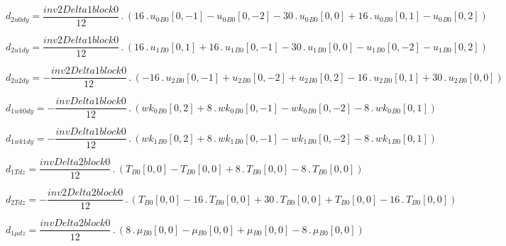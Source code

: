 \documentclass{article}
\begin{document}
\begin{dmath}d_{2 u0 dy} = \frac{inv2Delta1block0}{12} \,.\, \left(16 \,.\, {u_{0}{_{B0}}}[{0,-1}] - {u_{0}{_{B0}}}[{0,-2}] - 30 \,.\, {u_{0}{_{B0}}}[{0,0}] + 16 \,.\, {u_{0}{_{B0}}}[{0,1}] - {u_{0}{_{B0}}}[{0,2}]\right)\end{dmath}

\begin{dmath}d_{2 u1 dy} = \frac{inv2Delta1block0}{12} \,.\, \left(16 \,.\, {u_{1}{_{B0}}}[{0,1}] + 16 \,.\, {u_{1}{_{B0}}}[{0,-1}] - 30 \,.\, {u_{1}{_{B0}}}[{0,0}] - {u_{1}{_{B0}}}[{0,-2}] - {u_{1}{_{B0}}}[{0,2}]\right)\end{dmath}

\begin{dmath}d_{2 u2 dy} = - \frac{inv2Delta1block0}{12} \,.\, \left(- 16 \,.\, {u_{2}{_{B0}}}[{0,-1}] + {u_{2}{_{B0}}}[{0,-2}] + {u_{2}{_{B0}}}[{0,2}] - 16 \,.\, {u_{2}{_{B0}}}[{0,1}] + 30 \,.\, {u_{2}{_{B0}}}[{0,0}]\right)\end{dmath}

\begin{dmath}d_{1 wk0 dy} = - \frac{invDelta1block0}{12} \,.\, \left({wk_{0}{_{B0}}}[{0,2}] + 8 \,.\, {wk_{0}{_{B0}}}[{0,-1}] - {wk_{0}{_{B0}}}[{0,-2}] - 8 \,.\, {wk_{0}{_{B0}}}[{0,1}]\right)\end{dmath}

\begin{dmath}d_{1 wk1 dy} = - \frac{invDelta1block0}{12} \,.\, \left({wk_{1}{_{B0}}}[{0,2}] + 8 \,.\, {wk_{1}{_{B0}}}[{0,-1}] - {wk_{1}{_{B0}}}[{0,-2}] - 8 \,.\, {wk_{1}{_{B0}}}[{0,1}]\right)\end{dmath}

\begin{dmath}d_{1 T dz} = \frac{invDelta2block0}{12} \,.\, \left({T{_{B0}}}[{0,0}] - {T{_{B0}}}[{0,0}] + 8 \,.\, {T{_{B0}}}[{0,0}] - 8 \,.\, {T{_{B0}}}[{0,0}]\right)\end{dmath}

\begin{dmath}d_{2 T dz} = - \frac{inv2Delta2block0}{12} \,.\, \left({T{_{B0}}}[{0,0}] - 16 \,.\, {T{_{B0}}}[{0,0}] + 30 \,.\, {T{_{B0}}}[{0,0}] + {T{_{B0}}}[{0,0}] - 16 \,.\, {T{_{B0}}}[{0,0}]\right)\end{dmath}

\begin{dmath}d_{1 \mu dz} = \frac{invDelta2block0}{12} \,.\, \left(8 \,.\, {\mu{_{B0}}}[{0,0}] - {\mu{_{B0}}}[{0,0}] + {\mu{_{B0}}}[{0,0}] - 8 \,.\, {\mu{_{B0}}}[{0,0}]\right)\end{dmath}
\end{document}

